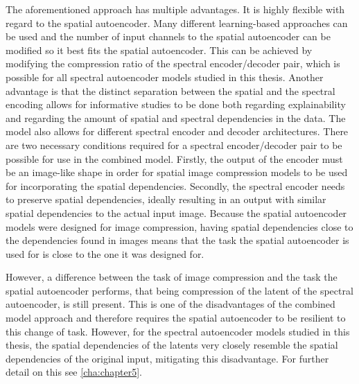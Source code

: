 The aforementioned approach has multiple advantages. It is highly flexible with regard to the spatial autoencoder. Many different learning-based approaches can be used and the number of input channels to the spatial autoencoder can be modified so it best fits the spatial autoencoder. This can be achieved by modifying the compression ratio of the spectral encoder/decoder pair, which is possible for all spectral autoencoder models studied in this thesis. Another advantage is that the distinct separation between the spatial and the spectral encoding allows for informative studies to be done both regarding explainability and regarding the amount of spatial and spectral dependencies in the data. The model also allows for different spectral encoder and decoder architectures. There are two necessary conditions required for a spectral encoder/decoder pair to be possible for use in the combined model. Firstly, the output of the encoder must be an image-like shape in order for spatial image compression models to be used for incorporating the spatial dependencies. Secondly, the spectral encoder needs to preserve spatial dependencies, ideally resulting in an output with similar spatial dependencies to the actual input image. Because the spatial autoencoder models were designed for image compression, having spatial dependencies close to the dependencies found in images means that the task the spatial autoencoder is used for is close to the one it was designed for.

However, a difference between the task of image compression and the task the spatial autoencoder performs, that being compression of the latent of the spectral autoencoder, is still present. This is one of the disadvantages of the combined model approach and therefore requires the spatial autoencoder to be resilient to this change of task. However, for the spectral autoencoder models studied in this thesis, the spatial dependencies of the latents very closely resemble the spatial dependencies of the original input, mitigating this disadvantage. For further detail on this see \autoref{cha:chapter5}.

